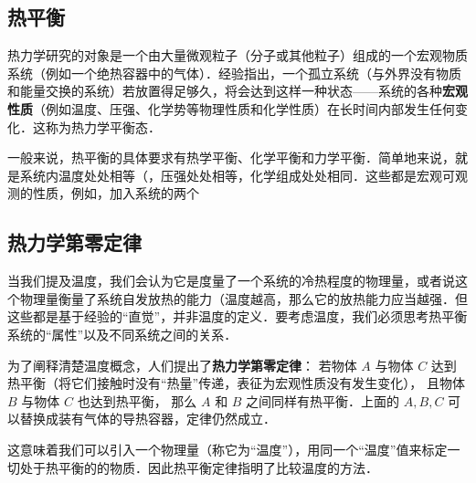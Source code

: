 
\begin{issues}
\issueDraft
\end{issues}

\subsection{热平衡}
热力学研究的对象是一个由大量微观粒子（分子或其他粒子）组成的一个宏观物质系统（例如一个绝热容器中的气体）．经验指出，一个孤立系统（与外界没有物质和能量交换的系统）若放置得足够久，将会达到这样一种状态——系统的各种\textbf{宏观性质}（例如温度、压强、化学势等物理性质和化学性质）在长时间内部发生任何变化．这称为热力学平衡态．

一般来说，热平衡的具体要求有热学平衡、化学平衡和力学平衡．简单地来说，就是系统内温度处处相等（，压强处处相等，化学组成处处相同．这些都是宏观可观测的性质，例如，加入系统的两个

\subsection{热力学第零定律}
当我们提及温度，我们会认为它是度量了一个系统的冷热程度的物理量，或者说这个物理量衡量了系统自发放热的能力（温度越高，那么它的放热能力应当越强．但这些都是基于经验的“直觉”，并非温度的定义．要考虑温度，我们必须思考热平衡系统的“属性”以及不同系统之间的关系．

为了阐释清楚温度概念，人们提出了\textbf{热力学第零定律}：
若物体 $A$ 与物体 $C$ 达到热平衡（将它们接触时没有“热量”传递，表征为宏观性质没有发生变化）， 且物体 $B$ 与物体 $C$ 也达到热平衡， 那么 $A$ 和 $B$ 之间同样有热平衡．上面的 $A,B,C$ 可以替换成装有气体的导热容器，定律仍然成立．

这意味着我们可以引入一个物理量（称它为“温度”），用同一个“温度”值来标定一切处于热平衡的的物质．因此热平衡定律指明了比较温度的方法．

